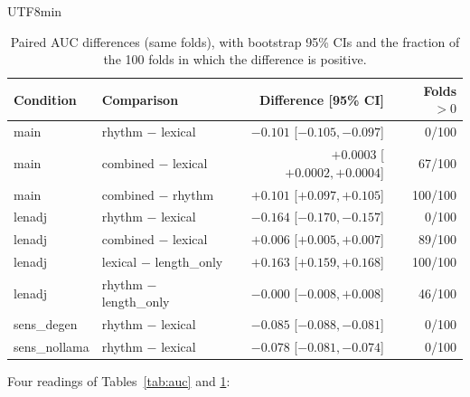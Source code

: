 \documentclass[11pt,a4paper]{article}
\begin{document}
\begin{CJK}{UTF8}{min}
\begin{table}[H]
\centering
\caption{Paired AUC differences (same folds), with bootstrap 95\% CIs and the fraction of the 100 folds in which the difference is positive.}
\label{tab:aucdiff}
\small
\begin{tabular}{llrr}
\toprule
Condition & Comparison & Difference [95\% CI] & Folds $>0$ \\
\midrule
main & rhythm $-$ lexical & $\mathbf{-0.101}$ [$-0.105, -0.097$] & 0/100 \\
main & combined $-$ lexical & $+0.0003$ [$+0.0002, +0.0004$] & 67/100 \\
main & combined $-$ rhythm & $+0.101$ [$+0.097, +0.105$] & 100/100 \\
lenadj & rhythm $-$ lexical & $-0.164$ [$-0.170, -0.157$] & 0/100 \\
lenadj & combined $-$ lexical & $+0.006$ [$+0.005, +0.007$] & 89/100 \\
lenadj & lexical $-$ length\_only & $+0.163$ [$+0.159, +0.168$] & 100/100 \\
lenadj & rhythm $-$ length\_only & $-0.000$ [$-0.008, +0.008$] & 46/100 \\
sens\_degen & rhythm $-$ lexical & $-0.085$ [$-0.088, -0.081$] & 0/100 \\
sens\_nollama & rhythm $-$ lexical & $-0.078$ [$-0.081, -0.074$] & 0/100 \\
\bottomrule
\end{tabular}
\end{table}

Four readings of Tables~\ref{tab:auc} and \ref{tab:aucdiff}:


\end{CJK}
\end{document}
